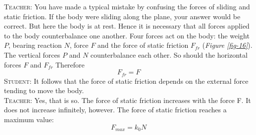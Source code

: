 \documentclass[a4paper,sfsidenotes]{tufte-book}
\begin{document}
\textsc{Teacher:} You have made a typical mistake by confusing the forces of sliding and static friction. If the body were sliding along the plane, your answer would be correct. But here the body is at rest. Hence it is necessary that all forces applied to the body counterbalance one another. Four forces act on the body: the weight $P$, bearing reaction $N$, force $F$ and the force of static friction $F_{fr}$ (\emph{Figure \ref{fig-16}}). The vertical forces $P$ and $N$ counterbalance each other. So should the horizontal forces
$F$ and $F_{fr}$ Therefore
\begin{equation}
F_{fr} = F
\label{eq-08}
\end{equation}
\textsc{Student:} It follows that the force of static friction depends on the external force tending to move the body.
\\
\textsc{Teacher:} Yes, that is so. The force of static friction increases with the force F. It does not increase infinitely, however. The force of static friction reaches a maximum value:
\begin{equation}
F_{max} = k_{0}N
\label{eq-09}
\end{equation}
\end{document}
